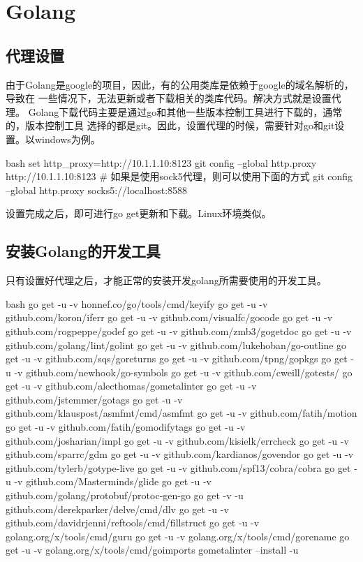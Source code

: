 \chapter{Golang}

\section{代理设置}
由于Golang是google的项目，因此，有的公用类库是依赖于google的域名解析的，导致在
一些情况下，无法更新或者下载相关的类库代码。解决方式就是设置代理。
Golang下载代码主要是通过go和其他一些版本控制工具进行下载的，通常的，版本控制工具
选择的都是git。因此，设置代理的时候，需要针对go和git设置。以windows为例。
\begin{code-block}{bash}
set http_proxy=http://10.1.1.10:8123
git config --global http.proxy http://10.1.1.10:8123
# 如果是使用sock5代理，则可以使用下面的方式
git config --global http.proxy socks5://localhost:8588
\end{code-block}

设置完成之后，即可进行go get更新和下载。Linux环境类似。

\section{安装Golang的开发工具}
只有设置好代理之后，才能正常的安装开发golang所需要使用的开发工具。
\begin{code-block}{bash}
go get -u -v honnef.co/go/tools/cmd/keyify
go get -u -v github.com/koron/iferr
go get -u -v github.com/visualfc/gocode
go get -u -v github.com/rogpeppe/godef
go get -u -v github.com/zmb3/gogetdoc
go get -u -v github.com/golang/lint/golint
go get -u -v github.com/lukehoban/go-outline
go get -u -v github.com/sqs/goreturns
go get -u -v github.com/tpng/gopkgs
go get -u -v github.com/newhook/go-symbols
go get -u -v github.com/cweill/gotests/
go get -u -v github.com/alecthomas/gometalinter
go get -u -v github.com/jstemmer/gotags
go get -u -v github.com/klauspost/asmfmt/cmd/asmfmt
go get -u -v github.com/fatih/motion
go get -u -v github.com/fatih/gomodifytags
go get -u -v github.com/josharian/impl
go get -u -v github.com/kisielk/errcheck
go get -u -v github.com/sparrc/gdm
go get -u -v github.com/kardianos/govendor
go get -u -v github.com/tylerb/gotype-live
go get -u -v github.com/spf13/cobra/cobra
go get -u -v github.com/Masterminds/glide
go get -u -v github.com/golang/protobuf/protoc-gen-go
go get -v -u github.com/derekparker/delve/cmd/dlv
go get -u -v github.com/davidrjenni/reftools/cmd/fillstruct
go get -u -v golang.org/x/tools/cmd/guru
go get -u -v golang.org/x/tools/cmd/gorename
go get -u -v golang.org/x/tools/cmd/goimports
gometalinter --install -u
\end{code-block}

